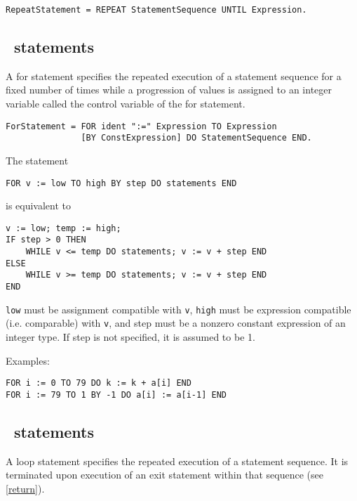 \documentclass[12pt]{article}
\begin{document}
\begin{lstlisting}[style=ebnf]
RepeatStatement = REPEAT StatementSequence UNTIL Expression.
\end{lstlisting} 

\subsection{\FOR\ statements}

A for statement specifies the repeated execution of a statement sequence for a fixed number of times while a progression of values is assigned to an integer variable called the control variable of the for statement.

\begin{lstlisting}[style=ebnf]
ForStatement = FOR ident ":=" Expression TO Expression 
               [BY ConstExpression] DO StatementSequence END.
\end{lstlisting} 

The statement

\begin{lstlisting}[style=example]
FOR v := low TO high BY step DO statements END
\end{lstlisting} 

is equivalent to

\begin{lstlisting}[style=example]
v := low; temp := high; 
IF step > 0 THEN
    WHILE v <= temp DO statements; v := v + step END 
ELSE
    WHILE v >= temp DO statements; v := v + step END 
END
\end{lstlisting} 
    
\lstinline!low! must be assignment compatible with \lstinline!v!, \lstinline!high! must be expression compatible (i.e. comparable) with \lstinline!v!, and step must be a nonzero constant expression of an integer type. If step is not specified, it is assumed to be 1.

Examples:
\begin{lstlisting}[style=example]
FOR i := 0 TO 79 DO k := k + a[i] END
FOR i := 79 TO 1 BY -1 DO a[i] := a[i-1] END
\end{lstlisting} 

\subsection{\LOOP\ statements}

A loop statement specifies the repeated execution of a statement sequence. It is terminated upon execution of an exit statement within that sequence (see \ref{return}).
\end{document}
